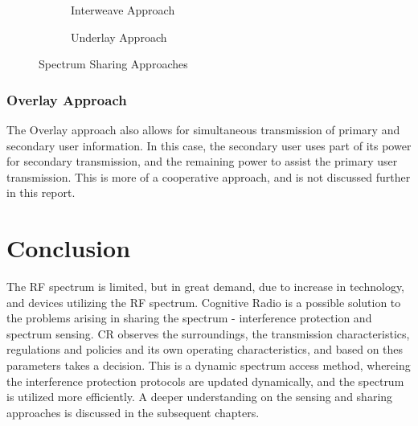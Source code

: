 \begin{figure}[h]
	\centering
	\begin{subfigure}{0.48\textwidth}
		
		\caption{Interweave Approach}
		\label{fig:interweave}
	\end{subfigure}
	\hfill
	\begin{subfigure}{0.48\textwidth}
		
		\caption{Underlay Approach}
		\label{fig:underlay}
	\end{subfigure}
	\caption{Spectrum Sharing Approaches}
\end{figure}

\subsubsection{Overlay Approach}
The Overlay approach also allows for simultaneous transmission of primary and
secondary user information. In this case, the secondary user uses part of its
power for secondary transmission, and the remaining power to assist the primary
user transmission. This is more of a cooperative approach, and is not discussed
further in this report.

\section{Conclusion}
The RF spectrum is limited, but in great demand, due to increase in technology,
and devices utilizing the RF spectrum. Cognitive Radio is a possible solution to
the problems arising in sharing the spectrum - interference protection and
spectrum sensing. CR observes the surroundings, the transmission
characteristics, regulations and policies and its own operating characteristics,
and based on thes parameters takes a decision. This is a dynamic spectrum access
method, whereing the interference protection protocols are updated dynamically,
and the spectrum is utilized more efficiently. A deeper understanding on the
sensing and sharing approaches is discussed in the subsequent chapters.
